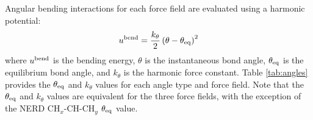 \documentclass[journal=jced,manuscript=article]{achemso}
\begin{document}
    Angular bending interactions for each force field are evaluated using a harmonic potential:
    \begin{equation}
    u^{\rm bend} = \frac{k_\theta}{2} \left(\theta-\theta_{\rm eq}\right)^2
    \end{equation}
    where $u^{\rm bend}$ is the bending energy, $\theta$ is the instantaneous bond angle, $\theta_{\rm eq}$ is the equilibrium bond angle, and $k_\theta$ is the harmonic force constant. Table \ref{tab:angles} provides the $\theta_{\rm eq}$ and $k_\theta$ values for each angle type and force field. Note that the $\theta_{\rm eq}$ and $k_\theta$ values are equivalent for the three force fields, with the exception of the NERD CH$_x$-CH-CH$_y$ $\theta_{\rm eq}$ value. 
    
    
\end{document}
